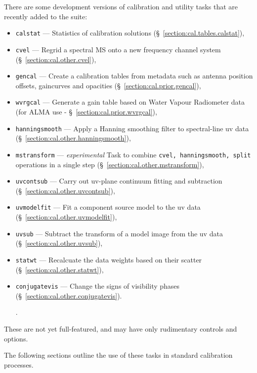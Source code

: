 There are some development versions of calibration and utility
tasks that are recently added to the suite:
\begin{itemize}
   \item {\tt calstat} --- Statistics of calibration solutions 
      (\S~\ref{section:cal.tables.calstat}),
   \item {\tt cvel} --- Regrid a spectral MS onto a new frequency
      channel system
      (\S~\ref{section:cal.other.cvel}),
   \item {\tt gencal} --- Create a calibration tables from metadata
     such as antenna position offsets, gaincurves and opacities 
      (\S~\ref{section:cal.prior.gencal}),
   \item {\tt wvrgcal} --- Generate a gain table based on Water Vapour
     Radiometer data (for ALMA use - \S~\ref{section:cal.prior.wvrgcal}),
   \item {\tt hanningsmooth} --- Apply a Hanning smoothing filter to
      spectral-line uv data
      (\S~\ref{section:cal.other.hanningsmooth}),
       \item {\tt mstransform} --- {\it experimental} Task to combine
         {\tt cvel, hanningsmooth, split} operations in a single step
      (\S~\ref{section:cal.other.mstransform}),
   \item {\tt uvcontsub} --- Carry out uv-plane continuum fitting and subtraction 
      (\S~\ref{section:cal.other.uvcontsub}),
   \item {\tt uvmodelfit} --- Fit a component source model to
     the uv data (\S~\ref{section:cal.other.uvmodelfit}),
   \item {\tt uvsub} --- Subtract the transform of a model image from
     the uv data (\S~\ref{section:cal.other.uvsub}),
   \item {\tt statwt} --- Recalcuate the data weights based on their
     scatter (\S~\ref{section:cal.other.statwt}),
   \item {\tt conjugatevis} --- Change the signs of visibility phases 
     (\S~\ref{section:cal.other.conjugatevis}).

.  
\end{itemize}
These are not yet full-featured, and may have only rudimentary
controls and options.

The following sections outline the use of these tasks in standard calibration
processes.

